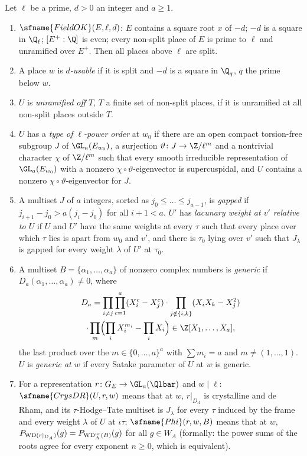 \begin{definition}\label{pf:galred:conds}
Let $\ell$ be a prime, $d>0$ an integer and $a\ge1$.
\begin{enumerate}[label=(\alph*),nosep]
\item $\sfname{FieldOK}(E,\ell,d)$: $E$ contains a square root $x$ of $-d$; $-d$ is a square in $\Q_\ell$; $[E^+:\Q]$ is
  even; every non-split place of $E$ is prime to $\ell$ and unramified over $E^+$. Then all places above $\ell$ are
  split.
\item A place $w$ is \emph{$d$-usable} if it is split and $-d$ is a square in $\Q_q$, $q$ the prime below $w$.
\item $U$ is \emph{unramified off $T$}, $T$ a finite set of non-split places, if it is unramified at all non-split
  places outside $T$.
\item $U$ has a \emph{type of $\ell$-power order} at $w_0$ if there are an open compact torsion-free subgroup $J$ of
  $\GL_a(E_{w_0})$, a surjection $\vartheta\colon J\to\Z/\ell^m$ and a nontrivial character $\chi$ of $\Z/\ell^m$ such that
  every smooth irreducible representation of $\GL_a(E_{w_0})$ with a nonzero $\chi\circ\vartheta$-eigenvector is
  supercuspidal, and $U$ contains a nonzero $\chi\circ\vartheta$-eigenvector for $J$.
\item A multiset $J$ of $a$ integers, sorted as $j_0\le\dots\le j_{a-1}$, is \emph{gapped} if $j_{i+1}-j_0>a(j_i-j_0)$ for
  all $i+1<a$. $U'$ has \emph{lacunary weight at $v'$ relative to $U$} if $U$ and $U'$ have the same weights at every
  $\tau$ such that every place over which $\tau$ lies is apart from $w_0$ and $v'$, and there is $\tau_0$ lying over $v'$
  such that $J_\lambda$ is gapped for every weight $\lambda$ of $U'$ at $\tau_0$.
\item A multiset $B=\{\alpha_1,\dots,\alpha_a\}$ of nonzero complex numbers is \emph{generic} if
  $D_a(\alpha_1,\dots,\alpha_a)\ne0$, where
  \begin{multline*}
    D_a=\prod_{i\ne j}\prod_{c=1}^{a}(X_i^c-X_j^c)\cdot\prod_{j\notin\{i,k\}}(X_iX_k-X_j^2)\\
    \cdot\prod_{m}\Bigl(\prod_iX_i^{m_i}-\prod_iX_i\Bigr)\in\Z[X_1,\dots,X_a],
  \end{multline*}
  the last product over the $m\in\{0,\dots,a\}^a$ with $\sum m_i=a$ and $m\ne(1,\dots,1)$. $U$ is \emph{generic at $w$} if
  every Satake parameter of $U$ at $w$ is generic.
\item For a representation $r\colon G_E\to\GL_a(\Qlbar)$ and $w\mid\ell$: $\sfname{CrysDR}(U,r,w)$ means that at $w$,
  $r|_{D_A}$ is crystalline and de Rham, and its $\tau$-Hodge--Tate multiset is $J_\lambda$ for every $\tau$ induced by the
  frame and every weight $\lambda$ of $U$ at $\iota\tau$; $\sfname{Phi}(r,w,B)$ means that at $w$,
  $P_{\mathrm{WD}(r|_{D_A})}(g)=P_{\mathrm{WD}^{\mathrm{ur}}_A(B)}(g)$ for all $g\in W_A$ (formally: the power sums of the roots agree for
  every exponent $n\ge0$, which is equivalent).
\end{enumerate}
\end{definition}

